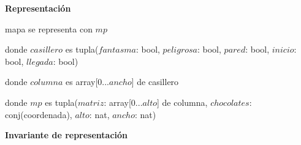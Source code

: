 \documentclass{book}
\begin{document}
    \textbf{Representación}

    mapa se representa con $mp$


    donde $casillero$ es tupla($fantasma$: bool, $peligrosa$: bool, $pared$: bool, $inicio$: bool, $llegada$: bool)

    donde $columna$ es array[0...$ancho$] de casillero

    donde $mp$ es tupla($matriz$: array[0...$alto$] de columna, $chocolates$: conj(coordenada), $alto$: nat, $ancho$: nat)



    \textbf{Invariante de representación}

\end{document}
